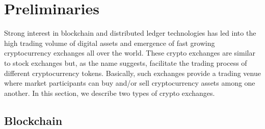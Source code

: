 \section{Preliminaries}

Strong interest in blockchain and distributed ledger technologies has led into the high trading volume of digital assets and emergence of fast growing cryptocurrency exchanges all over the world. These crypto exchanges are similar to stock exchanges but, as the name suggests, facilitate the trading process of different cryptocurrency tokens. Basically, such exchanges provide a trading venue where market participants can buy and/or sell cryptocurrency assets among one another. In this section, we describe two types of crypto exchanges.


\subsection{Blockchain}



